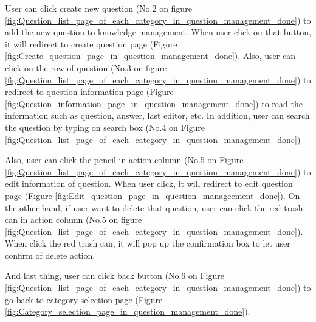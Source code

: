 \documentclass[12pt,oneside,openright,a4paper]{cpe-english-project}
\begin{document}
		\begin{flushleft}
			User can click create new question (No.2 on figure \ref*{fig:Question_list_page_of_each_category_in_question_management_done}) to add the new question to knowledge management. When user click on that button, it will redirect to create question page (Figure \ref*{fig:Create_question_page_in_question_management_done}). Also, user can click on the row of question (No.3 on figure \ref*{fig:Question_list_page_of_each_category_in_question_management_done}) to redirect to question information page (Figure \ref*{fig:Question_information_page_in_question_management_done}) to read the information such as question, answer, last editor, etc. In addition, user can search the question by typing on search box (No.4 on Figure \ref*{fig:Question_list_page_of_each_category_in_question_management_done})
		\end{flushleft}
		\begin{flushleft}
			Also, user can click the pencil in action column (No.5 on Figure \ref*{fig:Question_list_page_of_each_category_in_question_management_done}) to edit information of question. When user click, it will redirect to edit question page (Figure \ref*{fig:Edit_question_page_in_question_manageement_done}). On the other hand, if user want to delete that question, user can click the red trash can in action column (No.5 on figure \ref*{fig:Question_list_page_of_each_category_in_question_management_done}). When click the red trash can, it will pop up the confirmation box to let user confirm of delete action.
		\end{flushleft}
		\begin{flushleft}
			And last thing, user can click back button (No.6 on Figure \ref*{fig:Question_list_page_of_each_category_in_question_management_done}) to go back to category selection page (Figure \ref*{fig:Category_selection_page_in_question_management_done}).
		\end{flushleft}
\end{document}
